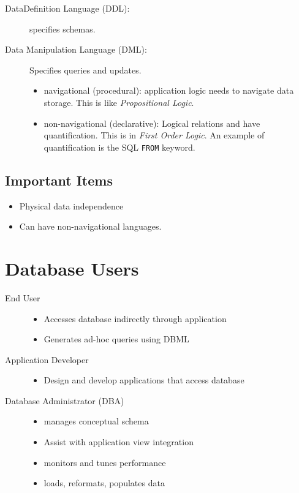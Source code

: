 \documentclass[12pt]{article}
\begin{document}
\begin{description}
    \item[DataDefinition Language (DDL):] specifies schemas.
    \item[Data Manipulation Language (DML):] Specifies queries and updates.
        \begin{itemize}
            \item navigational (procedural): application logic needs to navigate
                data storage.  This is like \textit{Propositional Logic}.
            \item non-navigational (declarative): Logical relations and have
                quantification. This is in \textit{First Order Logic}. An
                example of quantification is the SQL \texttt{FROM} keyword.
        \end{itemize}
\end{description}

\subsection*{Important Items}
\begin{itemize}
    \item Physical data independence
    \item Can have non-navigational languages.
\end{itemize}

\section*{Database Users}

\begin{description}
    \item[End User]\hfill
        \begin{itemize}
            \item Accesses database indirectly through application
            \item Generates ad-hoc queries using DBML
        \end{itemize}
    \item[Application Developer]\hfill
        \begin{itemize}
            \item Design and develop applications that access database
        \end{itemize}
    \item[Database Administrator (DBA)]\hfill
        \begin{itemize}
            \item manages conceptual schema
            \item Assist with application view integration
            \item monitors and tunes performance
            \item loads, reformats, populates data
        \end{itemize}
\end{description}
\end{document}
